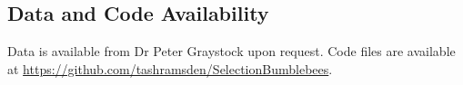 \documentclass[12pt]{article}
\begin{document}
\begin{linenumbers}



    
  
    \section{Data and Code Availability}
    
    Data is available from Dr Peter Graystock upon request. Code files are available at \linebreak \url{https://github.com/tashramsden/SelectionBumblebees}.
    
  
  	

     

    \end{linenumbers}    
\end{document}
